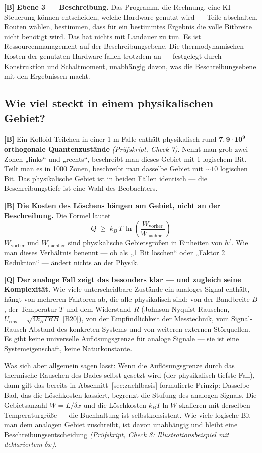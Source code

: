 \textbf{[B]} \textbf{Ebene 3 --- Beschreibung.} Das Programm, die Rechnung, eine
KI-Steuerung können entscheiden, welche Hardware genutzt wird --- Teile
abschalten, Routen wählen, bestimmen, dass für ein bestimmtes Ergebnis die volle
Bitbreite nicht benötigt wird. Das hat nichts mit Landauer zu tun. Es ist
Ressourcenmanagement auf der Beschreibungsebene. Die thermodynamischen Kosten der
genutzten Hardware fallen trotzdem an --- festgelegt durch Konstruktion und
Schaltmoment, unabhängig davon, was die Beschreibungsebene mit den Ergebnissen
macht.

\subsection{Wie viel steckt in einem physikalischen Gebiet?}

\textbf{[B]} Ein Kolloid-Teilchen in einer 1-\textmu m-Falle enthält physikalisch rund
$\mathbf{7{,}9\cdot10^{9}}$ \textbf{orthogonale Quantenzustände}
\emph{(Prüfskript, Check 7)}. Nennt man grob zwei Zonen „links“ und „rechts“, beschreibt man
dieses Gebiet mit 1 logischem Bit. Teilt man es in 1000 Zonen, beschreibt man
dasselbe Gebiet mit ${\sim}10$ logischen Bit. Das physikalische Gebiet ist in
beiden Fällen identisch --- die Beschreibungstiefe ist eine Wahl des Beobachters.

\textbf{[B]} \textbf{Die Kosten des Löschens hängen am Gebiet, nicht an der Beschreibung.}
Die Formel lautet
\[
  \boxed{\;Q \;\ge\; k_B\,T\,\ln\!\left(\frac{W_{\text{vorher}}}{W_{\text{nachher}}}\right)\;}
\]
$W_{\text{vorher}}$ und $W_{\text{nachher}}$ sind physikalische Gebietsgrößen in
Einheiten von $h^f$. Wie man dieses Verhältnis benennt --- ob als „1 Bit löschen“
oder „Faktor 2 Reduktion“ --- ändert nichts an der Physik.

\textbf{[Q]} \textbf{Der analoge Fall zeigt das besonders klar --- und zugleich seine
Komplexität.} Wie viele unterscheidbare Zustände ein analoges Signal enthält,
hängt von mehreren Faktoren ab, die alle physikalisch sind: von der Bandbreite
$B$, der Temperatur $T$ und dem Widerstand $R$ (Johnson-Nyquist-Rauschen,
$U_{\text{rms}} = \sqrt{4 k_B T R B}$ [B20]), von der Empfindlichkeit der
Messtechnik, vom Signal-Rausch-Abstand des konkreten Systems und von weiteren
externen Störquellen. Es gibt keine universelle Auflösungsgrenze für analoge
Signale --- sie ist eine Systemeigenschaft, keine Naturkonstante.

Was sich aber allgemein sagen lässt: Wenn die Auflösungsgrenze durch das
thermische Rauschen des Bades selbst gesetzt wird (der physikalisch tiefste Fall),
dann gilt das bereits in Abschnitt~\ref{sec:zaehlbasis} formulierte Prinzip:
Dasselbe Bad, das die Löschkosten kassiert, begrenzt die Stufung des analogen
Signals. Die Gebietsanzahl $W = L/\delta x$ und die Löschkosten $k_B T \ln W$
skalieren mit derselben Temperaturgröße --- die Buchhaltung ist selbstkonsistent.
Wie viele logische Bit man dem analogen Gebiet zuschreibt, ist davon unabhängig
und bleibt eine Beschreibungsentscheidung \emph{(Prüfskript, Check 8: Illustrationsbeispiel
mit deklariertem $\delta x$)}.

